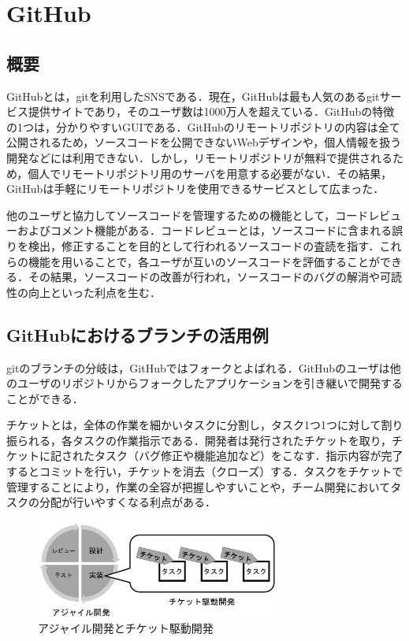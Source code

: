 \documentclass[a4j,9pt,twocolumn]{jsarticle}
\begin{document}
\section{GitHub}
\subsection{概要}
GitHubとは，gitを利用したSNSである．現在，GitHubは最も人気のあるgitサービス提供サイトであり，そのユーザ数は1000万人を超えている\cite{github}．GitHubの特徴の1つは，分かりやすいGUIである．GitHubのリモートリポジトリの内容は全て公開されるため，ソースコードを公開できないWebデザインや，個人情報を扱う開発などには利用できない．しかし，リモートリポジトリが無料で提供されるため，個人でリモートリポジトリ用のサーバを用意する必要がない．その結果，GitHubは手軽にリモートリポジトリを使用できるサービスとして広まった．

他のユーザと協力してソースコードを管理するための機能として，コードレビューおよびコメント機能がある．コードレビューとは，ソースコードに含まれる誤りを検出，修正することを目的として行われるソースコードの査読を指す．これらの機能を用いることで，各ユーザが互いのソースコードを評価することができる．その結果，ソースコードの改善が行われ，ソースコードのバグの解消や可読性の向上といった利点を生む．

\subsection{GitHubにおけるブランチの活用例}
gitのブランチの分岐は，GitHubではフォークとよばれる．GitHubのユーザは他のユーザのリポジトリからフォークしたアプリケーションを引き継いで開発することができる．

チケットとは，全体の作業を細かいタスクに分割し，タスク1つ1つに対して割り振られる，各タスクの作業指示である．開発者は発行されたチケットを取り，チケットに記されたタスク（バグ修正や機能追加など）をこなす．指示内容が完了するとコミットを行い，チケットを消去（クローズ）する．タスクをチケットで管理することにより，作業の全容が把握しやすいことや，チーム開発においてタスクの分配が行いやすくなる利点がある．

\begin{figure}[h]
\centering
\includegraphics[width=80mm]{img/dev.eps}
\caption{アジャイル開発とチケット駆動開発}
\label{dev}
\end{figure}
\end{document}
